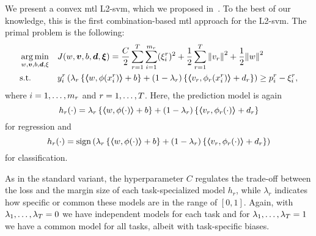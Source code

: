 We present a convex \acrshort{mtl} L2-\acrshort{svm}, which we proposed in~\cite{RuizAD21}. To the best of our knowledge, this is the first combination-based \acrshort{mtl} approach for the L2-\acrshort{svm}. The primal problem is the following:
\begin{equation}\label{eq:svmmtl_primal_convex_l2}
    \begin{aligned}
    & \argmin_{w, \fv{v}, b, \fv{d}, \xi}
    & & {J({w}, \fv{v}, b, \fv{d}, \fv{\xi}) = \frac{C}{2} \sum_{r= 1}^T \sum_{i=1}^{m_r} ({\xi_{i}^r})^2 + \frac{1}{2} \sum_{r= 1}^T{\norm{{v}_r}^2} + \frac{1}{2} {\norm{{w}}}^2} \\
    & \text{s.t.}
    & & y_{i}^r \left(\lambda_r \left\lbrace \dotp{w}{\phi(x_{i}^r)} + b  \right\rbrace + (1 - \lambda_r) \left\lbrace \dotp{{v}_r}{\phi_r(x_{i}^r)} + d_r \right\rbrace  \right) \geq p_{i}^r - \xi_{i}^r ,  \\
    \end{aligned}
\end{equation}
where $i=1, \ldots, m_r$ and $r=1, \ldots, T$.
Here, the prediction model is again
\begin{equation}
    \nonumber
    h_r(\cdot) = \lambda_r \left\lbrace \bm{\left\langle} w, \phi(\cdot) \bm{\right\rangle} + b  \right\rbrace + (1 - \lambda_r) \left\lbrace \bm{\left\langle} {v}_r, \phi_r(\cdot) \bm{\right\rangle} + d_r \right\rbrace
\end{equation}
for regression and 
\begin{equation}
    \nonumber
    h_r(\cdot) = \operatorname{sign}{ \left(\lambda_r \left\lbrace \bm{\left\langle} w, \phi(\cdot) \bm{\right\rangle} + b  \right\rbrace + (1 - \lambda_r) \left\lbrace \bm{\left\langle} {v}_r, \phi_r(\cdot) \bm{\right\rangle} + d_r \right\rbrace \right)}
\end{equation}
for classification.
%

As in the standard variant, the hyperparameter $C$ regulates the trade-off between the loss and the margin size of each task-specialized model $h_r$, while $\lambda_r$ indicates how specific or common these models are in the range of $[0, 1]$. Again, with $\lambda_1, \ldots, \lambda_T=0$ we have independent models for each task and for $\lambda_1, \ldots, \lambda_T=1$ we have a common model for all tasks, albeit with task-specific biases. 
 


